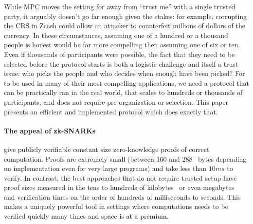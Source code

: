 \documentclass{article}
\begin{document}
 While MPC moves the setting for {\snarks} away from ``trust me'' with a single trusted party, it arguably doesn't go far enough given the stakes: for example, corrupting the {\snark} CRS in Zcash could allow an attacker to counterfeit millions of dollars of the currency. In these circumstances, assuming one of a hundred or a thousand people is honest would be far more compelling then assuming one of six or ten. Even if thousands of participants were possible, the fact that they need to be selected before the protocol starts is both a logistic challenge and itself a trust issue: who picks the people and who decides when enough have been picked? For {\snarks} to be used in many of their most compelling applications, we need a protocol that can be practically ran in the real world, that scales to hundreds or thousands of participants, and does not require pre-organization or selection.  This paper presents an efficient and implemented protocol which does exactly that.







\paragraph*{The appeal of zk-SNARKs}
{\snarks} give publicly  verifiable  constant size zero-knowledge proofs of correct computation. Proofs are extremely small (between 160\cite{Groth16} and 288~\cite{ParnoGHR13} bytes  depending on implementation even for very large programs) and take less than $10ms$ to verify.%
 In contrast, the best approaches that do not require trusted setup  have proof sizes measured in the tens to hundreds of kilobytes~\cite{ligero} or even megabytes~\cite{notyetStarks} and verification times on the order of hundreds of milliseconds to seconds\cite{ligero,notyetStarks}. This makes {\snarks} a uniquely powerful tool in  settings where computations needs to be verified quickly many times and space is at a premium.  
\end{document}
